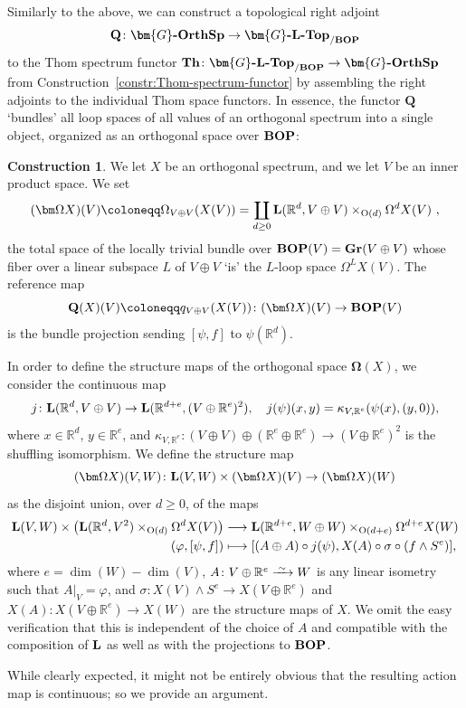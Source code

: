 \documentclass[reqno]{memo-l}
\theoremstyle{mythm}
\theoremstyle{definition}
\newtheorem{constr}[thm]{Construction}
\numberwithin{equation}{section}
\newcommand{\R} {{\mathbb{R}}}
\newcommand{\cat}[1]{\textbf{\textup{#1}}}
\renewcommand{\O}{{\textup{O}}}
\let\smashp=\wedge
\newcommand{\iso}{\xrightarrow{\;\smash{\raisebox{-0.25ex}{\ensuremath{\scriptstyle\sim}}}\;}}
\newcommand{\Gosp}[1]{\cat{$\bm{#1}$-OrthSp}}
\newcommand{\Gospc}[1]{\cat{$\bm{#1}$-$\cat{L}$-Top}}
\newcommand{\BOP}{\cat{BOP}}
\newcommand{\Gr}{\cat{Gr}}
\begin{document}
Similarly to the above, we can construct a topological right adjoint 
  \[ \textbf{Q}\colon \Gosp{G}\to \Gospc{G}_{/\BOP} \]
  to the Thom spectrum functor  $\cat{Th}\colon \Gospc{G}_{/\BOP}\to \Gosp{G}$ from Construction~\ref{constr:Thom-spectrum-functor} by assembling the right adjoints to the individual Thom space functors.
  In essence, the functor $\textbf{Q}$ `bundles' all loop spaces of all values of an orthogonal spectrum
  into a single object, organized as an orthogonal space over $\BOP$: 
\begin{constr}\label{con:bq}
  We let $X$ be  an orthogonal spectrum, and we let $V$ be an inner product space. We set
   \[ (\bm\Omega X)(V) \coloneqq \Omega_{V\oplus V}(X(V))= \coprod_{d\geq 0}\cat L(\R^d,V\oplus V)\times_{\O(d)} \Omega^dX(V) \ , \]
  the total space of the locally trivial bundle over $\BOP(V)=\Gr(V\oplus V)$ whose fiber over
  a linear subspace $L$ of $V\oplus V$ `is' the $L$-loop space $\Omega^LX(V)$.
  The reference map 
  \[ \cat{Q}(X)(V)\coloneqq q_{V\oplus V}(X(V))\colon (\bm\Omega X)(V) \to \BOP(V)\]
  is the bundle projection sending $[\psi,f]$ to $\psi(\mathbb R^d)$.

  In order to define the structure maps of the orthogonal space $\bm\Omega(X)$, we consider the continuous map
  \[ j\colon \cat L(\R^d,V\oplus V)\to\cat L(\R^{d+e},(V\oplus\mathbb R^e)^2),\quad
    j(\psi)(x,y) = \kappa_{V,\mathbb R^e}( \psi(x), (y,0)), \]
  where $x\in\mathbb R^d$, $y\in\mathbb R^e$, and  $\kappa_{V,\mathbb R^e}\colon (V\oplus V)\oplus(\R^e\oplus\R^e)\to (V\oplus\R^e)^2$
  is the shuffling isomorphism.
  We define the structure map
  \[ (\bm\Omega X)(V,W)\colon \cat L(V,W)\times (\bm\Omega X)(V)\to (\bm\Omega X)(W)\]
  as the disjoint union, over $d\geq 0$, of the maps
  \begin{equation}\label{eq:d_summand}\begin{aligned}
      \cat L(V,W)\times \left( \cat L(\R^d,V^2)\times_{\O(d)} \Omega^dX(V)\right)
      &\longrightarrow\cat L(\R^{d+e},W\oplus W)\times_{\O(d+e)} \Omega^{d+e}X(W)\\
      (\varphi,[\psi,f]) &\longmapsto[ (A\oplus A)\circ j(\psi), X(A)\circ\sigma\circ (f\smashp S^e)],
  \end{aligned}
  \end{equation}
  where $e=\dim(W)-\dim(V)$, $A\colon V\oplus \mathbb R^e\iso W$ is any linear isometry such that $A|_V=\varphi$, and $\sigma\colon X(V)\smashp S^e\to X(V\oplus\R^e)$ and $X(A)\colon X(V\oplus \R^e)\to X(W)$ are the structure maps of $X$. We omit the easy verification that this is independent of the choice of $A$ and compatible with the composition of $\cat{L}$ as well as with the projections to $\cat{BOP}$.
  \end{constr}
While clearly expected, it might not be entirely obvious that the resulting action map is
continuous; so we provide an argument.
\end{document}
